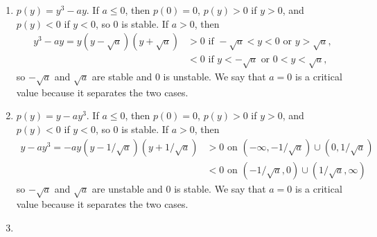 \documentclass[openany]{book}
\newenvironment{sectionSolutions}{
 \begin{enumerate}[item-label={\thesection.\arabic{enumi}.}]
}{
 \end{enumerate}
}
\begin{document}
\begin{sectionSolutions}
\item
$p(y)=y^3-ay$.
If $a\le0$, then $p(0)=0$, $p(y)>0$ if $y>0$, and $p(y)<0$ if $y<0$, so
$0$ is  stable.
 If $a>0$, then
\begin{align*}
y^3-ay=y(y-\sqrt a)(y+\sqrt a)&>0\text{ if }-\sqrt a<y<0\text{ or }
y>\sqrt a,\\
&<0\text{ if }y<-\sqrt a\text{ or }0<y<\sqrt a,
\end{align*}
so $-\sqrt a$ and $\sqrt a$ are  stable  and $0$
is unstable. We say that $a=0$ is a critical value
because  it separates the two cases.



\item
$p(y)=y-ay^3$. If $a\le0$, then $p(0)=0$, $p(y)>0$ if $y>0$, and
$p(y)<0$ if $y<0$, so $0$ is stable. If $a>0$, then
\begin{align*}
y-ay^3=-ay(y-1/\sqrt a)(y+1/\sqrt a)
&>0\text{ on }(-\infty,-1/\sqrt a)\cup(0,1/\sqrt a)\\
&<0\text{ on }(-1/\sqrt a,0)\cup(1/\sqrt a,\infty)
\end{align*}
so $-\sqrt a$ and $\sqrt a$ are unstable and $0$ is stable. We say
that $a=0$ is a critical value because it separates the two cases.


\addtocounter{enumi}{10}
\item%
\end{sectionSolutions}
\end{document}
